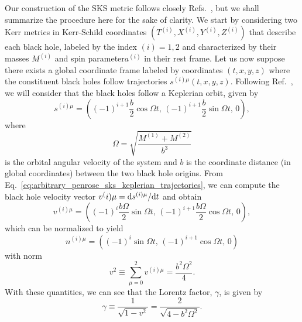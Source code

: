 Our construction of the SKS metric follows closely Refs.~\cite{Armengol:2021shd, PhysRevD.104.044041}, but we shall summarize the procedure here for the sake of clarity. We start by considering two Kerr metrics in Kerr-Schild coordinates $(T^{(i)}, X^{(i)}, Y^{(i)}, Z^{(i)})$ that describe each black hole, labeled by the index $(i) = 1,2$ and characterized by their masses $M^{(i)}$ and spin parameter$a^{(i)}$ in their rest frame. Let us now suppose there exists a global coordinate frame labeled by coordinates $(t,x,y,z)$ where the constituent black holes follow trajectories $s^{(i) \mu}(t, x, y, z)$. Following Ref.~\cite{Armengol:2021shd}, we will consider that the black holes follow a Keplerian orbit, given by
%
\begin{equation}
  s^{(i) \mu} = \left( (-1)^{i + 1}\frac{b}{2}\cos\Omega t,\, (-1)^{i + 1}\frac{b}{2}\sin\Omega t,\, 0 \right),
  \label{eq:arbitrary_penrose_sks_keplerian_trajectories}
\end{equation}
%
where
%
\begin{equation}
  \Omega = \sqrt{\frac{M^{(1)} + M^{(2)}}{b^3}}
  \label{eq:arbitrary_penrose_sks_angular_velocity}
\end{equation}
%
is the orbital angular velocity of the system and $b$ is the coordinate distance (in global coordinates) between the two black hole origins. From Eq.~\eqref{eq:arbitrary_penrose_sks_keplerian_trajectories}, we can compute the black hole velocity vector $v^(i) \mu = \mathrm{d} s^{(i) \mu} / \mathrm{d} t$ and obtain
%
\begin{equation}
  v^{(i) \mu} = \left( (-1)^i \frac{b\Omega}{2} \sin \Omega t,\, (-1)^{i+1} \frac{b\Omega}{2} \cos\Omega t,\, 0 \right),
  \label{eq:arbitrary_penrose_sks_keplerian_velocities}
\end{equation}
%
which can be normalized to yield
%
\begin{equation}
  n^{(i) \mu} = \left( (-1)^i \sin\Omega t,\, (-1)^{i+1}\cos\Omega t,\, 0 \right)
  \label{eq:arbitrary_penrose_sks_keplerian_velocities_norms}
\end{equation}
%
with norm
%
\begin{equation}
  v^2 \equiv \sum_{\mu = 0}^{2} v^{(i) \mu} = \frac{b^2 \Omega^2}{4}.
  \label{eq:arbitrary_penrose_sks_keplerian_velocities_norm}
\end{equation}
%
With these quantities, we can see that the Lorentz factor, $\gamma$, is given by
%
\begin{equation}
  \gamma \equiv \frac{1}{\sqrt{1 - v^2}} = \frac{2}{\sqrt{4 - b^2\Omega^2}}.
  \label{eq:arbitrary_penrose_sks_keplerian_orbit_lorentz_factor}
\end{equation}
